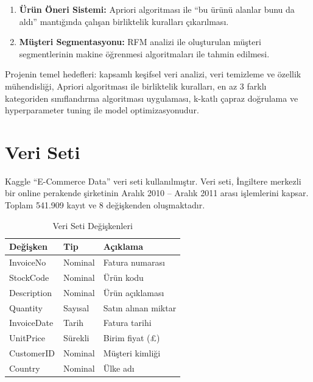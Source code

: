 \documentclass[conference]{IEEEtran}
\begin{document}
\begin{enumerate}[leftmargin=*]
    \item \textbf{Ürün Öneri Sistemi:} Apriori algoritması ile ``bu ürünü alanlar bunu da aldı'' mantığında çalışan birliktelik kuralları çıkarılması.
    \item \textbf{Müşteri Segmentasyonu:} RFM analizi ile oluşturulan müşteri segmentlerinin makine öğrenmesi algoritmaları ile tahmin edilmesi.
\end{enumerate}

Projenin temel hedefleri: kapsamlı keşifsel veri analizi, veri temizleme ve özellik mühendisliği, Apriori algoritması ile birliktelik kuralları, en az 3 farklı kategoriden sınıflandırma algoritması uygulaması, k-katlı çapraz doğrulama ve hyperparameter tuning ile model optimizasyonudur.

\section{Veri Seti}

Kaggle ``E-Commerce Data'' \cite{kaggle_ecommerce} veri seti kullanılmıştır. Veri seti, İngiltere merkezli bir online perakende şirketinin Aralık 2010 -- Aralık 2011 arası işlemlerini kapsar. Toplam 541.909 kayıt ve 8 değişkenden oluşmaktadır.

\begin{table}[h]
\centering
\caption{Veri Seti Değişkenleri}
\label{tab:features}
\begin{tabular}{p{1.8cm}p{1.3cm}p{4.5cm}}
\toprule
\textbf{Değişken} & \textbf{Tip} & \textbf{Açıklama} \\
\midrule
InvoiceNo & Nominal & Fatura numarası \\
StockCode & Nominal & Ürün kodu \\
Description & Nominal & Ürün açıklaması \\
Quantity & Sayısal & Satın alınan miktar \\
InvoiceDate & Tarih & Fatura tarihi \\
UnitPrice & Sürekli & Birim fiyat (£) \\
CustomerID & Nominal & Müşteri kimliği \\
Country & Nominal & Ülke adı \\
\bottomrule
\end{tabular}
\end{table}
\end{document}
